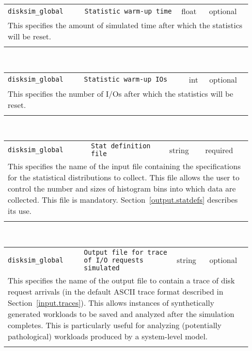 \noindent 
\begin{tabular}{|p{1.5in}|p{3.5in}|p{0.5in}|p{0.5in}|}
\cline{1-4}
\texttt{disksim\_global} & \texttt{Statistic warm-up time} & float & optional \\ 
\cline{1-4}
\multicolumn{4}{|p{6in}|}{
This specifies the amount of simulated time after which the statistics
will be reset.
}\\ 
\cline{1-4}
\multicolumn{4}{p{5in}}{}\\
\end{tabular}\\ 
\noindent 
\begin{tabular}{|p{1.5in}|p{3.5in}|p{0.5in}|p{0.5in}|}
\cline{1-4}
\texttt{disksim\_global} & \texttt{Statistic warm-up IOs} & int & optional \\ 
\cline{1-4}
\multicolumn{4}{|p{6in}|}{
This specifies the number of I/Os after which the statistics will be reset.
}\\ 
\cline{1-4}
\multicolumn{4}{p{5in}}{}\\
\end{tabular}\\ 
\noindent 
\begin{tabular}{|p{1.5in}|p{3.5in}|p{0.5in}|p{0.5in}|}
\cline{1-4}
\texttt{disksim\_global} & \texttt{Stat definition file} & string & required \\ 
\cline{1-4}
\multicolumn{4}{|p{6in}|}{
This specifies the name of the input file containing the
specifications for the statistical distributions to collect. This
file allows the user to control the number and sizes of histogram bins
into which data are collected. This file is mandatory.
Section~\ref{output.statdefs} describes its use.
}\\ 
\cline{1-4}
\multicolumn{4}{p{5in}}{}\\
\end{tabular}\\ 
\noindent 
\begin{tabular}{|p{1.5in}|p{3.5in}|p{0.5in}|p{0.5in}|}
\cline{1-4}
\texttt{disksim\_global} & \texttt{Output file for trace of I/O requests simulated} & string & optional \\ 
\cline{1-4}
\multicolumn{4}{|p{6in}|}{
This specifies the name of the output file to contain a trace of disk
request arrivals (in the default ASCII trace format described in
Section~\ref{input.traces}). This allows instances of synthetically
generated workloads to be saved and analyzed after the simulation
completes. This is particularly useful for analyzing (potentially
pathological) workloads produced by a system-level model.
}\\ 
\cline{1-4}
\multicolumn{4}{p{5in}}{}\\
\end{tabular}\\ 
